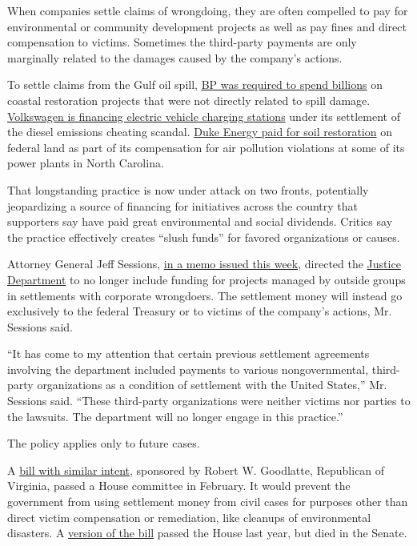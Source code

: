When companies settle claims of wrongdoing, they are often compelled to
pay for environmental or community development projects as well as pay
fines and direct compensation to victims. Sometimes the third-party
payments are only marginally related to the damages caused by the
company's actions.

To settle claims from the Gulf oil spill,
\href{https://www.nytimes3xbfgragh.onion/interactive/2015/07/02/us/bp-oil-spill-settlement-background.html?mcubz=1}{BP
was required to spend billions} on coastal restoration projects that
were not directly related to spill damage.
\href{https://www.nytimes3xbfgragh.onion/2017/03/30/business/volkswagen-diesel-penalties.html?mcubz=1}{Volkswagen
is financing electric vehicle charging stations} under its settlement of
the diesel emissions cheating scandal.
\href{https://www.nytimes3xbfgragh.onion/2015/09/11/us/duke-energy-to-pay-fine-over-power-plant-violations.html?mcubz=1}{Duke
Energy paid for soil restoration} on federal land as part of its
compensation for air pollution violations at some of its power plants in
North Carolina.

That longstanding practice is now under attack on two fronts,
potentially jeopardizing a source of financing for initiatives across
the country that supporters say have paid great environmental and social
dividends. Critics say the practice effectively creates ``slush funds''
for favored organizations or causes.

Attorney General Jeff Sessions,
\href{https://www.eenews.net/assets/2017/06/07/document_gw_01.pdf}{in a
memo issued this week}, directed the
\href{https://www.nytimes3xbfgragh.onion/topic/organization/us-justice-department}{Justice
Department} to no longer include funding for projects managed by outside
groups in settlements with corporate wrongdoers. The settlement money
will instead go exclusively to the federal Treasury or to victims of the
company's actions, Mr. Sessions said.

``It has come to my attention that certain previous settlement
agreements involving the department included payments to various
nongovernmental, third-party organizations as a condition of settlement
with the United States,'' Mr. Sessions said. ``These third-party
organizations were neither victims nor parties to the lawsuits. The
department will no longer engage in this practice.''

The policy applies only to future cases.

A
\href{https://www.congress.gov/bill/115th-congress/house-bill/732/text/ih}{bill
with similar intent}, sponsored by Robert W. Goodlatte, Republican of
Virginia, passed a House committee in February. It would prevent the
government from using settlement money from civil cases for purposes
other than direct victim compensation or remediation, like cleanups of
environmental disasters. A
\href{https://www.congress.gov/bill/114th-congress/house-bill/5063/text}{version
of the bill} passed the House last year, but died in the Senate.

